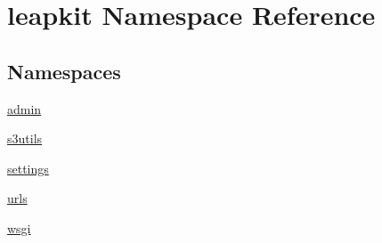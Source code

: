 \hypertarget{namespaceleapkit}{\section{leapkit Namespace Reference}
\label{namespaceleapkit}
}
\subsection*{Namespaces}
\begin{DoxyCompactItemize}
\item 
\hyperlink{namespaceleapkit_1_1admin}{admin}
\item 
\hyperlink{namespaceleapkit_1_1s3utils}{s3utils}
\item 
\hyperlink{namespaceleapkit_1_1settings}{settings}
\item 
\hyperlink{namespaceleapkit_1_1urls}{urls}
\item 
\hyperlink{namespaceleapkit_1_1wsgi}{wsgi}
\end{DoxyCompactItemize}
